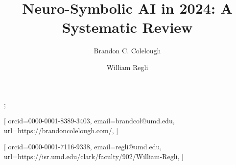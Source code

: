 \documentclass[hf]{ceurart}
\begin{document}

;

\title{Neuro-Symbolic AI in 2024: A Systematic Review}


\author[1]{Brandon C. Colelough}[%
orcid=0000-0001-8389-3403,
email=brandcol@umd.edu,
url=https://brandoncolelough.com/,
]
\cormark[1]
\fnmark[1]
\address[1]{University of Maryland, College Park,
  8125 Paint Branch Dr, College Park, MD 20742}



\author[2]{William Regli}[%
orcid=0000-0001-7116-9338,
email=regli@umd.edu,
url=https://isr.umd.edu/clark/faculty/902/William-Regli,
]

\end{document}
